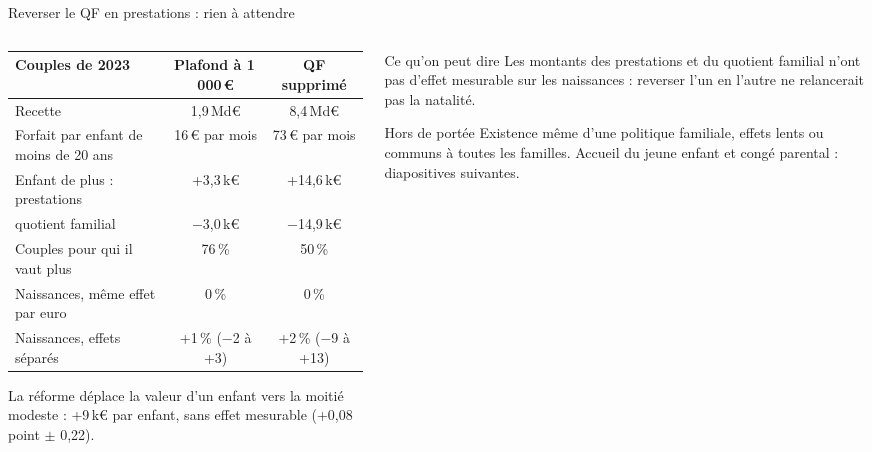 \documentclass[10pt,aspectratio=169]{beamer}
\begin{document}
\begin{frame}{Reverser le QF en prestations : rien à attendre}
  \begin{columns}[T]
    \begin{column}{0.57\textwidth}
      \scriptsize\setlength{\tabcolsep}{3pt}
      \begin{tabular}{@{}lcc@{}}
        \toprule
        Couples de 2023 & Plafond à 1\,000\,€ & QF supprimé \\
        \midrule
        Recette & 1,9\,Md€ & 8,4\,Md€ \\
        Forfait par enfant de moins de 20 ans & 16\,€ par mois & 73\,€ par mois \\
        Enfant de plus : prestations & +3,3\,k€ & +14,6\,k€ \\
        \quad quotient familial & $-$3,0\,k€ & $-$14,9\,k€ \\
        Couples pour qui il vaut plus & 76\,\% & 50\,\% \\
        \midrule
        Naissances, même effet par euro & 0\,\% & 0\,\% \\
        Naissances, effets séparés & +1\,\% ($-$2 à +3) & +2\,\% ($-$9 à +13) \\
        \bottomrule
      \end{tabular}
      \vspace{0.25cm}

      \small\RaggedRight La réforme déplace la valeur d'un enfant vers la moitié modeste : +9\,k€ par enfant, sans effet mesurable (+0,08 point $\pm$ 0,22).
    \end{column}
    \begin{column}{0.39\textwidth}
      \begin{callout}[tdtenavy]{Ce qu'on peut dire}
        \scriptsize\RaggedRight Les montants des prestations et du quotient familial n'ont pas d'effet mesurable sur les naissances : reverser l'un en l'autre ne relancerait pas la natalité.
      \end{callout}
      \begin{callout}{Hors de portée}
        \scriptsize\RaggedRight Existence même d'une politique familiale, effets lents ou communs à toutes les familles. Accueil du jeune enfant et congé parental : diapositives suivantes.
      \end{callout}
    \end{column}
  \end{columns}
\end{frame}
\end{document}
